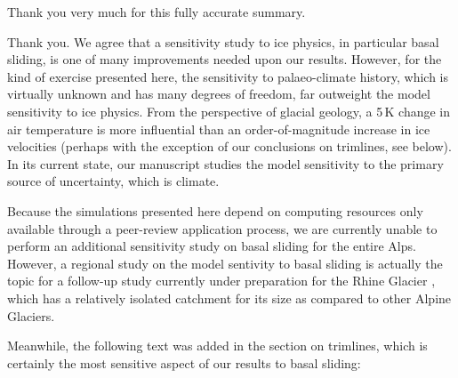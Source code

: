     Thank you very much for this fully accurate summary.


    Thank you.
    We agree that a sensitivity study to ice physics, in particular basal
    sliding, is one of many improvements needed upon our results. However, for
    the kind of exercise presented here, the sensitivity to palaeo-climate
    history, which is virtually unknown and has many degrees of freedom, far
    outweight the model sensitivity to ice physics. From the perspective of
    glacial geology, a 5\,K change in air temperature is more influential than
    an order-of-magnitude increase in ice velocities (perhaps with the
    exception of our conclusions on trimlines, see below). In its current
    state, our manuscript studies the model sensitivity to the primary source
    of uncertainty, which is climate.

    Because the simulations presented here depend on computing
    resources only available through a peer-review application process, we are
    currently unable to perform an additional sensitivity study on basal
    sliding for the entire Alps. However, a regional study on the model
    sentivity to basal sliding is actually
    the topic for a follow-up study currently under preparation for the Rhine
    Glacier \citep{Imhof.etal.2017}, which has a relatively isolated catchment
    for its size as compared to other Alpine Glaciers.

    Meanwhile, the following text was added in the section on trimlines, which
    is certainly the most sensitive aspect of our results to basal sliding:


